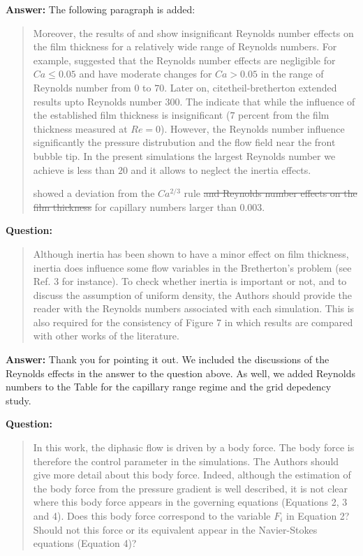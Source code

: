 \documentclass{article}
\begin{document}
\textbf{Answer:} The following paragraph is added:
\begin{quotation}
Moreover, the results of \citet{giavedoni-numerical} and \citet{heil-bretherton} show
{\color{red} insignificant} Reynolds number effects on the film thickness for a relatively wide
range of Reynolds
numbers. 
{\color{red} For example, \citet{giavedoni-numerical} suggested that the Reynolds number effects
are negligible for $Ca\leq0.05$ and have moderate changes for $Ca>0.05$ in the range of Reynolds
number from $0$ to $70$. Later on, citet{heil-bretherton} extended results upto Reynolds number
$300$. The indicate that while the influence of the established film thickness is insignificant
($7$ percent from the film thickness measured at $Re=0$). However, the Reynolds number influence
significantly the pressure distrubution and the flow field near the front bubble tip. In
the present simulations the largest Reynolds number we achieve is less than $20$ and it allows to
neglect the
inertia effects.} 

\citet{kreutzer-pressure-drop} showed a deviation from the $Ca^{2/3}$ rule
{\color{red}\sout{and Reynolds number 
effects on the film thickness}} for capillary numbers larger than $0.003$.
\end{quotation}

\textbf{Question:}
\begin{quotation}
Although inertia has been shown to have a minor effect on ﬁlm thickness, inertia does influence
some flow variables in the Bretherton’s problem (see Ref. 3 for instance). To check whether inertia
is important or not, and to discuss the assumption of uniform density, the Authors should provide
the reader with the Reynolds numbers associated with each simulation. This is also required for the
consistency of Figure 7 in which results are compared with other works of the literature.
\end{quotation}

\textbf{Answer:} Thank you for pointing it out. We included the discussions of the Reynolds
effects in the answer to the question above. As well, we added Reynolds numbers to the Table for
the capillary range regime and the grid depedency study. 

\textbf{Question:}
\begin{quotation}
In this work, the diphasic flow is driven by a body force. The body force is therefore the control
parameter in the simulations. The Authors should give more detail about this body force. Indeed,
although the estimation of the body force from the pressure gradient is well described, it is not
clear
where this body force appears in the governing equations (Equations 2, 3 and 4). Does this body
force correspond to the variable $F_i$ in Equation 2? Should not this force or its equivalent appear
in
the Navier-Stokes equations (Equation 4)?
\end{quotation}
\end{document}
